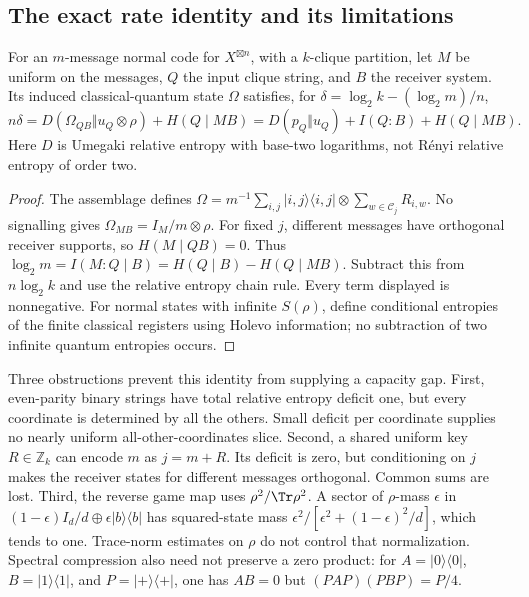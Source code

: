 \subsection{The exact rate identity and its limitations}
\begin{lemma}\label{lem:rateidentity}
For an $m$-message normal code for $X^{\boxtimes n}$, with a $k$-clique
partition, let $M$ be uniform on the messages, $Q$ the input clique
string, and $B$ the receiver system. Its induced classical-quantum state
$\Omega$ satisfies, for $\delta=\log_2k-(\log_2m)/n$,
\begin{equation}\label{eq:rateidentity}
 n\delta=D(\Omega_{Q B}\Vert u_Q\otimes\rho)
              +H(Q\mid MB)
 =D(p_Q\Vert u_Q)+I(Q:B)+H(Q\mid MB).
\end{equation}
Here $D$ is Umegaki relative entropy with base-two logarithms, not
R\'enyi relative entropy of order two.
\end{lemma}
\begin{proof}
The assemblage defines
$\Omega=m^{-1}\sum_{i,j}|i,j\rangle\langle i,j|\otimes
\sum_{w\in\mathcal C_j}R_{i,w}$. No signalling gives
$\Omega_{MB}=I_M/m\otimes\rho$. For fixed $j$, different messages
have orthogonal receiver supports, so $H(M\mid Q B)=0$.
Thus $\log_2m=I(M:Q\mid B)=H(Q\mid B)-H(Q\mid MB)$.
Subtract this from $n\log_2k$ and use the relative entropy chain rule.
Every term displayed is nonnegative. For normal states with infinite
$S(\rho)$, define conditional entropies of the finite classical
registers using Holevo information; no subtraction of two infinite
quantum entropies occurs.
\end{proof}

Three obstructions prevent this identity from supplying a capacity gap.
First, even-parity binary strings have total relative entropy deficit
one, but every coordinate is determined by all the others. Small deficit
per coordinate supplies no nearly uniform all-other-coordinates slice.
Second, a shared uniform key $R\in\mathbb Z_k$ can encode $m$ as
$j=m+R$. Its deficit is zero, but conditioning on $j$ makes the receiver
states for different messages orthogonal. Common sums are lost.
Third, the reverse game map uses $\rho^2/\Tr\rho^2$. A sector of
$\rho$-mass $\epsilon$ in
$(1-\epsilon)I_d/d\oplus\epsilon|b\rangle\langle b|$ has squared-state
mass $\epsilon^2/[\epsilon^2+(1-\epsilon)^2/d]$, which tends to one.
Trace-norm estimates on $\rho$ do not control that normalization.
Spectral compression also need not preserve a zero product: for
$A=|0\rangle\langle0|$, $B=|1\rangle\langle1|$, and
$P=|+\rangle\langle+|$, one has $AB=0$ but
$(PAP)(PBP)=P/4$.

